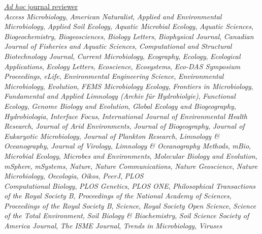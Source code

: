 \documentclass[11pt]{article}
\begin{document}
\vspace{-0.5em}
\textnormal{\underline{\textit{Ad hoc} journal reviewer}}\\[0.15em] 
\textit{Access Microbiology}, \textit{American Naturalist}, \textit{Applied and Environmental Microbiology}, \textit{Applied Soil Ecology}, \textit{Aquatic Microbial Ecology}, \textit{Aquatic Sciences}, \textit{Biogeochemistry}, \textit{Biogeosciences}, \textit{Biology Letters}, \textit{Biophysical Journal}, \textit{Canadian Journal of Fisheries and Aquatic Sciences}, \textit{Computational and Structural Biotechnology Journal}, \textit{Current Microbiology}, \textit{Ecography}, \textit{Ecology}, \textit{Ecological Applications}, \textit{Ecology Letters}, \textit{Ecoscience}, \textit{Ecosystems}, \textit{Eco-DAS Symposium Proceedings}, \textit{eLife}, \textit{Environmental Engineering Science}, \textit{Environmental Microbiology}, \textit{Evolution}, \textit{FEMS Microbiology Ecology}, \textit{Frontiers in Microbiology}, \textit{Fundamental and Applied Limnology (Archiv für Hydrobiolgie)}, \textit{Functional Ecology}, \textit{Genome Biology and Evolution}, \textit{Global Ecology and Biogeography}, \textit{Hydrobiologia}, \textit{Interface Focus}, \textit{International Journal of Environmental Health Research}, \textit{Journal of Arid Environments}, \textit{Journal of Biogeography}, \textit{Journal of Eukaryotic Microbiology}, \textit{Journal of Plankton Research}, \textit{Limnology \& Oceanography}, \textit{Journal of Virology}, \textit{Limnology \& Oceanography Methods}, \textit{mBio}, \textit{Microbial Ecology}, \textit{Microbes and Environments}, \textit{Molecular Biology and Evolution}, \textit{mSphere}, \textit{mSystems}, \textit{Nature}, \textit{Nature Communications}, \textit{Nature Geoscience}, \textit{Nature Microbiology}, \textit{Oecologia}, \textit{Oikos}, \textit{PeerJ}, \textit{PLOS \\Computational Biology}, \textit{PLOS Genetics}, \textit{PLOS ONE}, \textit{Philosophical Transactions of the Royal Society B}, \textit{Proceedings of the National Academy of Sciences}, \textit{Proceedings of the Royal Society B}, \textit{Science}, \textit{Royal Society Open Science}, \textit{Science of the Total Environment}, \textit{Soil Biology \& Biochemistry}, \textit{Soil Science Society of America Journal}, \textit{The ISME Journal}, \textit{Trends in Microbiology}, \textit{Viruses}
\end{document}

